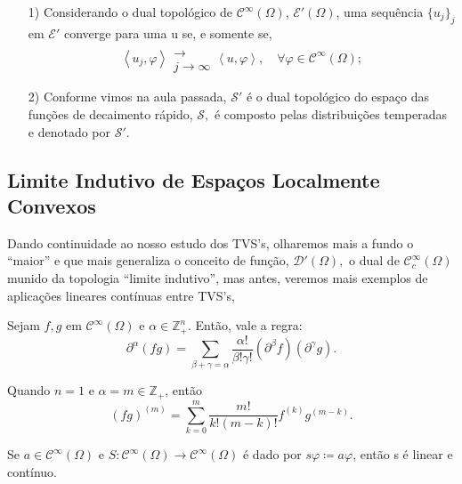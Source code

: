 \documentclass[../distribution_theory_notes.tex]{subfiles}
\begin{document}
\begin{example}
	\begin{itemize}
		\item[1)] Considerando o dual topológico de \(\mathcal{C}^{\infty}(\Omega )\), \(\mathcal{E}'(\Omega )\), uma sequência \(\{u_{j}\}_{j}\) em \(\mathcal{E}'\) converge para uma u se, e somente se,
		      \[
			      \left< u_{j}, \varphi  \right>\substack{ \\ \longrightarrow \\ j\to \infty} \left< u, \varphi  \right>,\quad \forall \varphi \in \mathcal{C}^{\infty}(\Omega );
		      \]
		\item[2)] Conforme vimos na aula passada, \(\mathcal{S}'\) é o dual topológico do espaço das funções de decaimento rápido, \(\mathcal{S},\) é composto pelas distribuições temperadas e denotado por \(\mathcal{S}'\).
	\end{itemize}
\end{example}

\subsection{Limite Indutivo de Espaços Localmente Convexos}
Dando continuidade ao nosso estudo dos TVS's, olharemos mais a fundo o ``maior'' e que mais generaliza o conceito de função, \(\mathcal{D}'(\Omega ),\) o dual de \(\mathcal{C}_{c}^{\infty}(\Omega )\) munido da topologia ``limite indutivo'', mas antes, veremos mais exemplos de aplicações lineares contínuas entre TVS's,
\begin{lemma*}
	Sejam \(f, g\) em \(\mathcal{C}^{\infty}(\Omega )\) e \(\alpha \in \mathbb{Z}_{+}^{n}\). Então, vale a regra:
	\[
		\partial^{\alpha }(fg)=\sum\limits_{\beta+\gamma =\alpha }^{}\frac{\alpha!}{\beta!\gamma!}(\partial^{\beta }f)(\partial^{\gamma }g).
	\]
\end{lemma*}
Quando \(n=1\) e \(\alpha =m\in \mathbb{Z}_{+}\), então
\[
	(fg)^{(m)} = \sum\limits_{k=0}^{m}\frac{m!}{k!(m-k)!}f^{(k)}g^{(m-k)}.
\]
\begin{lemma*}
	Se \(a\in \mathcal{C}^{\infty}(\Omega )\) e \(S:\mathcal{C}^{\infty}(\Omega )\rightarrow \mathcal{C}^{\infty}(\Omega )\) é dado por \(s\varphi\coloneqq a \varphi \), então s é linear e contínuo.
\end{lemma*}
\end{document}
